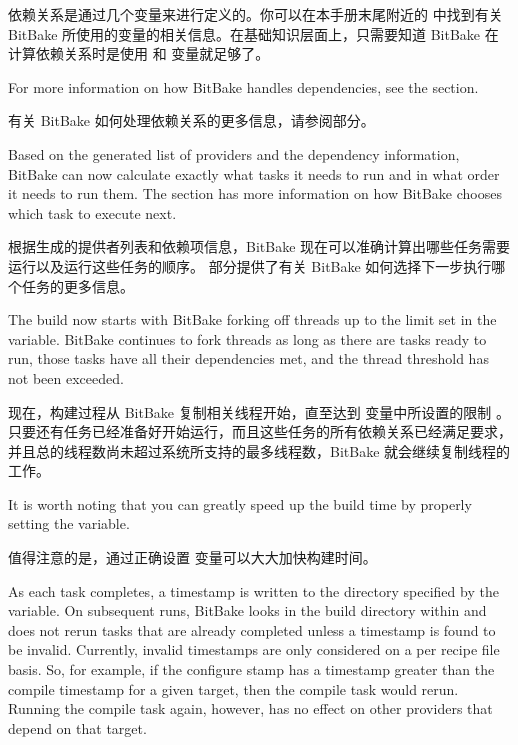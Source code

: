 依赖关系是通过几个变量来进行定义的。你可以在本手册末尾附近的  中找到有关 BitBake 所使用的变量的相关信息。在基础知识层面上，只需要知道 BitBake 在计算依赖关系时是使用  和  变量就足够了。

For more information on how BitBake handles dependencies, see the  section.

有关 BitBake 如何处理依赖关系的更多信息，请参阅部分。


Based on the generated list of providers and the dependency information, BitBake can now calculate exactly what tasks it needs to run and in what order it needs to run them. The  section has more information on how BitBake chooses which task to execute next.

根据生成的提供者列表和依赖项信息，BitBake 现在可以准确计算出哪些任务需要运行以及运行这些任务的顺序。 部分提供了有关 BitBake 如何选择下一步执行哪个任务的更多信息。

The build now starts with BitBake forking off threads up to the limit set in the  variable. BitBake continues to fork threads as long as there are tasks ready to run, those tasks have all their dependencies met, and the thread threshold has not been exceeded.

现在，构建过程从 BitBake 复制相关线程开始，直至达到  变量中所设置的限制 。只要还有任务已经准备好开始运行，而且这些任务的所有依赖关系已经满足要求，并且总的线程数尚未超过系统所支持的最多线程数，BitBake 就会继续复制线程的工作。

It is worth noting that you can greatly speed up the build time by properly setting the  variable.

值得注意的是，通过正确设置  变量可以大大加快构建时间。

As each task completes, a timestamp is written to the directory specified by the  variable. On subsequent runs, BitBake looks in the build directory within  and does not rerun tasks that are already completed unless a timestamp is found to be invalid. Currently, invalid timestamps are only considered on a per recipe file basis. So, for example, if the configure stamp has a timestamp greater than the compile timestamp for a given target, then the compile task would rerun. Running the compile task again, however, has no effect on other providers that depend on that target.

